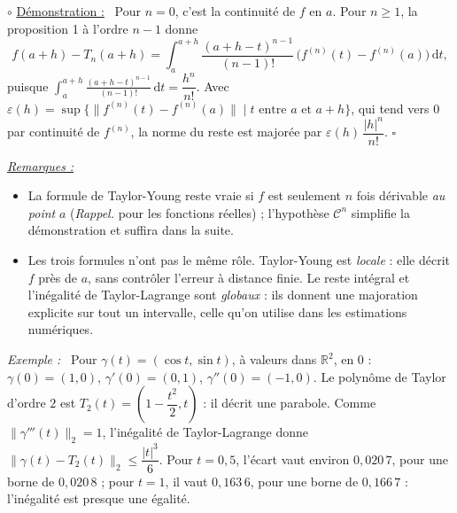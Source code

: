 \documentclass[a4paper,twoside]{report}
\newenvironment{demo}%
 {\par\needspace{4\baselineskip}\vspace{1mm}\noindent$\circ$ \underline{Démonstration :}~\setlength{\parskip}{3pt plus 1pt}}%
 {\hfill$\square$\par\vspace{2mm}}
\newenvironment{exemple}%
 {\par\needspace{6\baselineskip}\vspace{1mm}\begin{list}{}{\leftmargin=1cm \rightmargin=0.5cm}\item[]%
  \textit{Exemple :}~}%
 {\end{list}\vspace{1mm}}
\newenvironment{remarques}%
 {\par\needspace{6\baselineskip}\vspace{1mm}\begin{list}{}{\leftmargin=1cm \rightmargin=0.5cm}\item[]%
  \textit{\underline{Remarques :}}%
  \begin{itemize}[label=$\bullet$,leftmargin=0.45cm,topsep=3pt,itemsep=4pt]}%
 {\end{itemize}\end{list}\vspace{1mm}}
\newcommand{\R}{\mathbb{R}}
\newcommand{\dd}{\mathrm{d}}                      %
\newcommand{\norme}[1]{\lVert #1 \rVert}         %
\newcommand{\Cc}{\mathcal{C}}                     %
\begin{document}
\begin{demo}
Pour $n = 0$, c'est la continuité de $f$ en $a$. Pour $n \geqslant 1$, la proposition 1 à l'ordre $n - 1$ donne
\[ f(a + h) - T_{n}(a + h) = \int_{a}^{a + h} \frac{(a + h - t)^{n - 1}}{(n - 1)!}\,\big(f^{(n)}(t) - f^{(n)}(a)\big)\,\dd t, \]
puisque $\displaystyle\int_{a}^{a + h} \frac{(a + h - t)^{n - 1}}{(n - 1)!}\,\dd t = \dfrac{h^{n}}{n!}$. Avec $\varepsilon(h) = \sup\{\norme{f^{(n)}(t) - f^{(n)}(a)} \mid t \text{ entre } a \text{ et } a + h\}$, qui tend vers $0$ par continuité de $f^{(n)}$, la norme du reste est majorée par $\varepsilon(h)\,\dfrac{|h|^{n}}{n!}$.
\end{demo}

\begin{remarques}
  \item La formule de Taylor-Young reste vraie si $f$ est seulement $n$ fois dérivable \emph{au point} $a$ (\emph{Rappel.} pour les fonctions réelles) ; l'hypothèse $\Cc^{n}$ simplifie la démonstration et suffira dans la suite.
  \item Les trois formules n'ont pas le même rôle. Taylor-Young est \emph{locale} : elle décrit $f$ près de $a$, sans contrôler l'erreur à distance finie. Le reste intégral et l'inégalité de Taylor-Lagrange sont \emph{globaux} : ils donnent une majoration explicite sur tout un intervalle, celle qu'on utilise dans les estimations numériques.
\end{remarques}

\begin{exemple}
Pour $\gamma(t) = (\cos t, \sin t)$, à valeurs dans $\R^{2}$, en $0$ : $\gamma(0) = (1, 0)$, $\gamma'(0) = (0, 1)$, $\gamma''(0) = (-1, 0)$. Le polynôme de Taylor d'ordre $2$ est $T_{2}(t) = \left(1 - \dfrac{t^{2}}{2}, t\right)$ : il décrit une parabole. Comme $\norme{\gamma'''(t)}_{2} = 1$, l'inégalité de Taylor-Lagrange donne $\norme{\gamma(t) - T_{2}(t)}_{2} \leqslant \dfrac{|t|^{3}}{6}$. Pour $t = 0{,}5$, l'écart vaut environ $0{,}020\,7$, pour une borne de $0{,}020\,8$ ; pour $t = 1$, il vaut $0{,}163\,6$, pour une borne de $0{,}166\,7$ : l'inégalité est presque une égalité.
\end{exemple}
\end{document}
